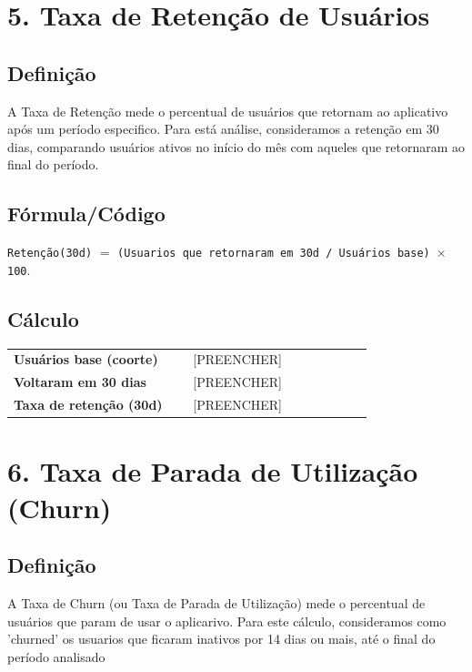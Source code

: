 \documentclass[12pt]{article}
\providecommand{\RetencaoBase}{[PREENCHER]}
\providecommand{\RetencaoRetornaram}{[PREENCHER]}
\providecommand{\RetencaoTaxa}{[PREENCHER]}
\begin{document}
\section*{5. Taxa de Retenção de Usuários}
\subsection*{Definição}
A Taxa de Retenção mede o percentual de usuários que retornam ao aplicativo após um período especifico. Para está análise, consideramos a retenção em 30 dias, comparando usuários ativos no início do mês com aqueles que retornaram ao final do período.

\subsection*{Fórmula/Código}
\noindent \texttt{Retenção(30d)} $=$ \texttt{(Usuarios que retornaram em 30d / Usuários base) $\times$ 100}.

\subsection*{Cálculo}
\begin{center}
\begin{tabular}{>{\bfseries}p{0.45\linewidth} p{0.45\linewidth}}
\toprule
Usuários base (coorte) & \RetencaoBase \\
Voltaram em 30 dias & \RetencaoRetornaram \\
Taxa de retenção (30d) & \RetencaoTaxa \\
\bottomrule
\end{tabular}
\end{center}

\section*{6. Taxa de Parada de Utilização (Churn)}
\subsection*{Definição}
A Taxa de Churn (ou Taxa de Parada de Utilização) mede o percentual de usuários que param de usar o aplicarivo. Para este cálculo, consideramos como 'churned' os usuarios que ficaram inativos por 14 dias ou mais, até o final do período analisado
\end{document}
